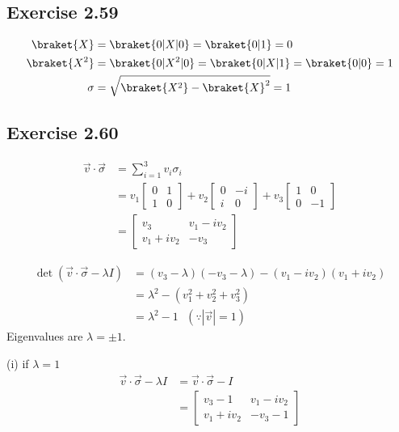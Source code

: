 \documentclass[a4paper,12pt]{article}
\begin{document}
\subsection*{Exercise 2.59}
\begin{align*}
	\braket{X} &= \braket{0 | X | 0} = \braket{0 | 1} = 0\\
	\braket{X^2} &= \braket{0 | X^2 | 0} = \braket{0 | X | 1} =\braket{0 | 0} = 1\\
	\sigma &= \sqrt{ \braket{X^2} - \braket{X}^2 } = 1
\end{align*}


\subsection*{Exercise 2.60}
\begin{align*}
    \vec{v} \cdot \vec{\sigma} &= \sum_{i=1}^3 v_i \sigma_i\\
    &= v_1 \begin{bmatrix}
        0 & 1 \\
        1 & 0
    \end{bmatrix}
    + v_2 \begin{bmatrix}
        0 & -i \\
        i & 0
    \end{bmatrix}
    + v_3 \begin{bmatrix}
        1 & 0 \\
        0 & -1
    \end{bmatrix} \\
    &= \begin{bmatrix}
        v_3 & v_1 - i v_2 \\
        v_1 + iv_2 & -v_3
    \end{bmatrix}
\end{align*}

\begin{align*}
    \det (\vec{v} \cdot \vec{\sigma}  - \lambda I) &= (v_3 - \lambda) (-v_3 - \lambda) - (v_1 - iv_2) (v_1 + iv_2)\\
    &= \lambda^2 - (v_1^2 + v_2^2  + v_3^2)\\
    &= \lambda^2 - 1 ~~~ (\because |\vec{v}| = 1)
\end{align*}
Eigenvalues are $\lambda = \pm 1$.


(i) if $\lambda = 1$
\begin{align*}
	\vec{v} \cdot \vec{\sigma}  - \lambda I &= \vec{v} \cdot \vec{\sigma}  - I\\
		&= \begin{bmatrix}
    		v_3 - 1 & v_1 - i v_2 \\
    		v_1 + i v_2 & - v_3 - 1
		\end{bmatrix}
\end{align*}
\end{document}
